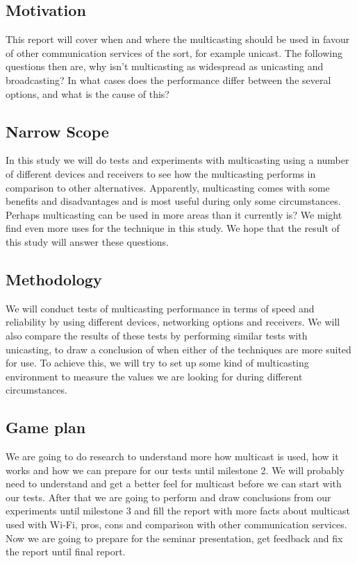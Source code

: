 \documentclass[9pt,a4paper]{acmproc}
\begin{document}
\subsection{Motivation}

This report will cover when and where the multicasting should be used in favour of other communication services of the sort, for example unicast. The following questions then are, why isn't multicasting as widespread as unicasting and broadcasting? In what cases does the performance differ between the several options, and what is the cause of this?

\subsection{Narrow Scope}

In this study we will do tests and experiments with multicasting using a number of different devices and receivers to see how the multicasting performs in comparison to other alternatives. Apparently, multicasting comes with some benefits and disadvantages and is most useful during only some circumstances. Perhaps multicasting can be used in more areas than it currently is? We might find even more uses for the technique in this study. We hope that the result of this study will answer these questions.

\subsection{Methodology}

We will conduct tests of multicasting performance in terms of speed and reliability by using different devices, networking options and receivers. We will also compare the results of these tests by performing similar tests with unicasting, to draw a conclusion of when either of the techniques are more suited for use. To achieve this, we will try to set up some kind of multicasting environment to measure the values we are looking for during different circumstances.

\subsection{Game plan}

We are going to do research to understand more how multicast is used, how it works and how we can prepare for our tests until milestone 2. We will probably need to understand and get a better feel for multicast before we can start with our tests. After that we are going to perform and draw conclusions from our experiments until milestone 3 and fill the report with more facts about multicast used with Wi-Fi, pros, cons and comparison with other communication services. Now we are going to prepare for the seminar presentation, get feedback and fix the report until final report.
\end{document}
